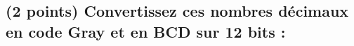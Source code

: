 \documentclass[11pt,a4paper]{article}
\begin{document}
\bigskip

\bigskip

\subsection{(2 points) Convertissez ces nombres décimaux en code Gray et en BCD sur 12 bits : }

\bigskip

\end{document}
